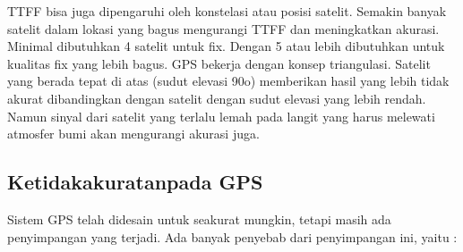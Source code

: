 \begin{itemize}
TTFF bisa juga dipengaruhi oleh konstelasi atau posisi satelit. Semakin banyak satelit dalam lokasi yang bagus mengurangi TTFF dan meningkatkan akurasi. Minimal dibutuhkan 4 satelit untuk fix. Dengan 5 atau lebih dibutuhkan untuk kualitas fix yang lebih bagus. 
GPS bekerja dengan konsep triangulasi. Satelit yang berada tepat di atas (sudut elevasi 90o) memberikan hasil yang lebih tidak akurat dibandingkan dengan satelit dengan sudut elevasi yang lebih rendah. Namun sinyal dari satelit yang terlalu lemah pada langit yang harus melewati atmosfer bumi akan mengurangi akurasi juga.
\end{itemize}

\subsection{Ketidakakuratanpada GPS   }
Sistem GPS telah didesain untuk seakurat mungkin, tetapi masih ada penyimpangan yang terjadi. Ada banyak penyebab dari penyimpangan ini, yaitu :
